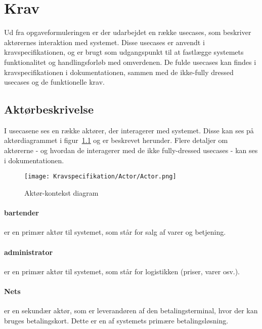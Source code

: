 \chapter{Krav}
Ud fra opgaveformuleringen er der udarbejdet en række \gls{usecase}s, som beskriver aktørernes interaktion med systemet. Disse \gls{usecase}s er anvendt i kravspecifikationen, og er brugt som udgangspunkt til at fastlægge systemets funktionalitet og handlingsforløb med omverdenen. De fulde \gls{usecase}s kan findes i kravspecifikationen i dokumentationen, sammen med de ikke-fully dressed \gls{usecase}s og de funktionelle krav.
\newline

\begin{minipage}{0.45\textwidth}
\raggedright
\section{Aktørbeskrivelse}
I \gls{usecase}ne ses en række aktører, der interagerer med systemet. Disse kan ses på aktørdiagrammet i figur~\ref{fig:actordiagram} og er beskrevet herunder. Flere detaljer om aktørerne - og hvordan de interagerer med de ikke fully-dressed \gls{usecase}s - kan ses i dokumentationen. 
\newline
\newline
\end{minipage}
\begin{minipage}{0.55\textwidth}
\begin{figure}[H]
	\centering
	\texttt{[image: Kravspecifikation/Actor/Actor.png]}
	\caption{Aktør-kontekst diagram}
	\label{fig:actordiagram}
\end{figure}
\end{minipage} \hfill
\newline
\subsubsection*{\Gls{bartender}}
er en primær aktør til systemet, som står for salg af varer og betjening. 

\subsubsection*{\Gls{administrator}}
er en primær aktør til systemet, som står for logistikken (priser, varer osv.). 

\subsubsection*{Nets}
er en sekundær aktør, som er leverandøren af den \gls{betalingsterminal}, hvor der kan bruges \gls{betalingskort}. Dette er en af systemets primære betalingsløsning.

